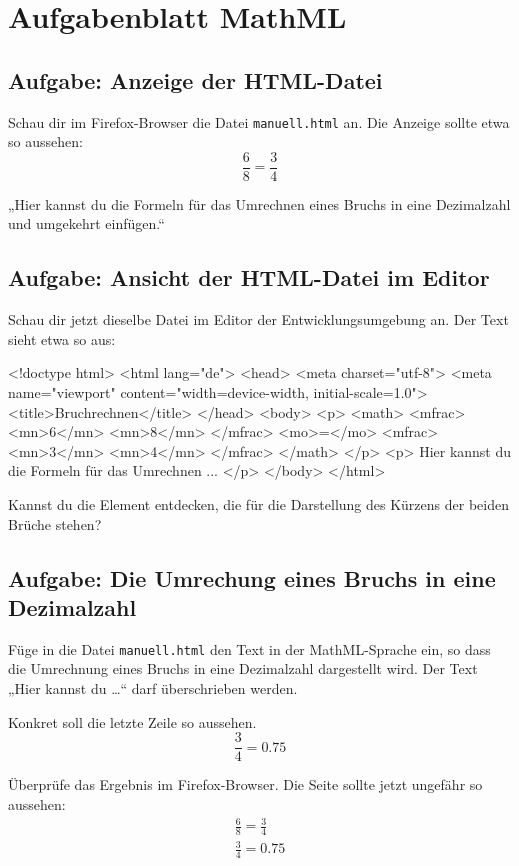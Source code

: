 \section{Aufgabenblatt MathML}

\subsection*{Aufgabe: Anzeige der HTML-Datei}

Schau dir im Firefox-Browser die Datei \texttt{manuell.html} an. Die Anzeige sollte etwa so aussehen:
\[
\frac{6}{8} = \frac{3}{4}
\]

„Hier kannst du die Formeln für das Umrechnen eines Bruchs in eine Dezimalzahl und umgekehrt einfügen.“

\subsection*{Aufgabe: Ansicht der HTML-Datei im Editor}

Schau dir jetzt dieselbe Datei im Editor der Entwicklungsumgebung an. Der Text sieht etwa so aus:

\begin{codeHTML}
<!doctype html>
<html lang="de">
	<head>
		<meta charset="utf-8">
		<meta name="viewport" content="width=device-width, initial-scale=1.0">
		<title>Bruchrechnen</title>
	</head>
	<body>
		<p>
			<math>
				<mfrac>
					<mn>6</mn>
					<mn>8</mn>
				</mfrac>
				<mo>=</mo>
				<mfrac>
					<mn>3</mn>
					<mn>4</mn>
				</mfrac>
			</math>
		</p>
		<p>
 			Hier kannst du die Formeln für das Umrechnen ...
		</p>
	</body>
</html>
\end{codeHTML}

Kannst du die Element entdecken, die für die Darstellung des Kürzens der beiden Brüche stehen?

\subsection*{Aufgabe: Die Umrechung eines Bruchs in eine Dezimalzahl}

Füge in die Datei \texttt{manuell.html} den Text in der MathML-Sprache ein, so dass die Umrechnung eines Bruchs in eine Dezimalzahl dargestellt wird. Der Text „Hier kannst du \dots“ darf überschrieben werden.

Konkret soll die letzte Zeile so aussehen.
\[
\frac{3}{4} = 0.75
\]

Überprüfe das Ergebnis im Firefox-Browser. Die Seite sollte jetzt ungefähr so aussehen:
\begin{align*}
& \frac{6}{8} = \frac{3}{4} & \\[2ex]
& \frac{3}{4} = 0.75 &
\end{align*}

